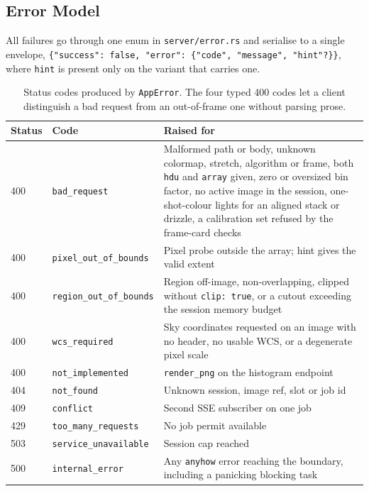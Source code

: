 \documentclass[11pt,a4paper]{article}
\newcommand{\code}[1]{\texttt{\small #1}}
\newcommand{\crate}[1]{\texttt{#1}}
\begin{document}
    \subsection{Error Model}

    All failures go through one enum in \code{server/error.rs} and serialise to a single envelope, \code{\{"success": false, "error": \{"code", "message", "hint"?\}\}}, where \code{hint} is present only on the variant that carries one.

    \begin{table}[H]
        \centering
        \small
        \begin{tabularx}{\textwidth}{llX}
            \toprule
            \textbf{Status} & \textbf{Code} & \textbf{Raised for} \\
            \midrule
            400 & \code{bad\_request} & Malformed path or body, unknown colormap, stretch, algorithm or frame, both \code{hdu} and \code{array} given, zero or oversized bin factor, no active image in the session, one-shot-colour lights for an aligned stack or drizzle, a calibration set refused by the frame-card checks \\
            400 & \code{pixel\_out\_of\_bounds} & Pixel probe outside the array; hint gives the valid extent \\
            400 & \code{region\_out\_of\_bounds} & Region off-image, non-overlapping, clipped without \code{clip: true}, or a cutout exceeding the session memory budget \\
            400 & \code{wcs\_required} & Sky coordinates requested on an image with no header, no usable WCS, or a degenerate pixel scale \\
            400 & \code{not\_implemented} & \code{render\_png} on the histogram endpoint \\
            404 & \code{not\_found} & Unknown session, image ref, slot or job id \\
            409 & \code{conflict} & Second SSE subscriber on one job \\
            429 & \code{too\_many\_requests} & No job permit available \\
            503 & \code{service\_unavailable} & Session cap reached \\
            500 & \code{internal\_error} & Any \crate{anyhow} error reaching the boundary, including a panicking blocking task \\
            \bottomrule
        \end{tabularx}
        \caption{Status codes produced by \code{AppError}. The four typed 400 codes let a client distinguish a bad request from an out-of-frame one without parsing prose.}
    \end{table}
\end{document}
